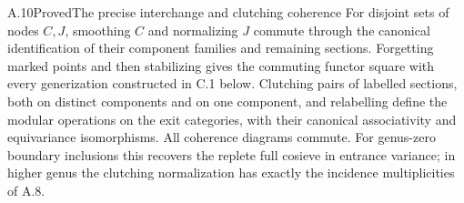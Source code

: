 \begin{result}{A.10}{Proved}{The precise interchange and clutching coherence}
For disjoint sets of nodes $C,J$, smoothing $C$ and normalizing $J$ commute through the canonical identification of their component families and remaining sections. Forgetting marked points and then stabilizing gives the commuting functor square with every generization constructed in C.1 below. Clutching pairs of labelled sections, both on distinct components and on one component, and relabelling define the modular operations on the exit categories, with their canonical associativity and equivariance isomorphisms. All coherence diagrams commute. For genus-zero boundary inclusions this recovers the replete full cosieve in entrance variance; in higher genus the clutching normalization has exactly the incidence multiplicities of A.8.
\end{result}
